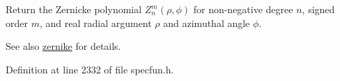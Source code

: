 Return the Zernicke polynomial $ Z_n^m(\rho,\phi) $ for non-\/negative degree $ n $, signed order $ m $, and real radial argument $ \rho $ and azimuthal angle $ \phi $.

\begin{DoxySeeAlso}{See also}
\hyperlink{group__gnu__math__spec__func_gaaed33f29c1eb1d2c5b9590fe2e57151c}{zernike} for details. 
\end{DoxySeeAlso}


Definition at line 2332 of file specfun.\+h.

